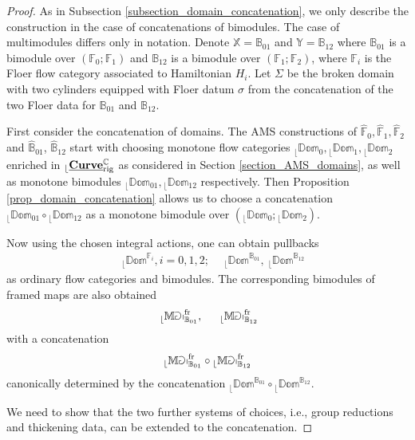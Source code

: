 \documentclass[reqno, 10pt]{amsart}
\numberwithin{equation}{section}
\numberwithin{equation}{section}
\theoremstyle{definition}
\theoremstyle{remark}
\newcommand{\beqn}{\begin{equation*}}
\newcommand{\eeqn}{\end{equation*}}
\newcommand{\mb}{\mathbb}
\renewcommand{\outer}{{}_{\lfloor}}
\newcommand{\uds}[1]{\underline{\smash{#1}}}
\begin{document}
\begin{proof}
As in Subsection \ref{subsection_domain_concatenation}, we only describe the construction in the case of concatenations of bimodules. The case of multimodules differs only in notation. Denote ${\mb X} = {\mb B}_{01}$ and ${\mb Y} = {\mb B}_{12}$ where ${\mb B}_{01}$ is a bimodule over $({\mb F}_0; {\mb F}_1)$ and $\mb{B}_{12}$ is a bimodule over $({\mb F}_1; \mb{F}_2)$, where ${\mb F}_i$ is the Floer flow category associated to Hamiltonian $H_i$. Let $\Sigma$ be the broken domain with two cylinders equipped with Floer datum $\sigma$ from the concatenation of the two Floer data for $\mb{B}_{01}$ and $\mb{B}_{12}$. 

First consider the concatenation of domains. The AMS constructions of $\hat {\mb F}_0, \hat {\mb F}_1, \hat {\mb F}_2$ and $\hat {\mb B}_{01}$, $\hat {\mb B}_{12}$ start with choosing monotone flow categories $\outer \mb{Dom}_0, \outer \mb{Dom}_1, \outer \mb{Dom}_2$ enriched in $\outer \uds{\bf Curve}_{\rm rig}^{\mb C}$ as considered in Section \ref{section_AMS_domains}, as well as monotone bimodules $\outer \mb{Dom}_{01}, \outer \mb{Dom}_{12}$ respectively. Then Proposition \ref{prop_domain_concatenation} allows us to choose a concatenation $\outer \mb{Dom}_{01} \circ \outer \mb{Dom}_{12}$ as a monotone bimodule over $(\outer \mb{Dom}_0; \outer \mb{Dom}_2)$. 

Now using the chosen integral actions, one can obtain pullbacks 
\begin{align*}
&\ \outer \mb{Dom}^{{\mb F}_i}, i = 0, 1, 2;\ &\ \outer \mb{Dom}^{{\mb B}_{01}},\ \outer \mb{Dom}^{{\mb B}_{12}}
\end{align*}
as ordinary flow categories and bimodules. The corresponding bimodules of framed maps are also obtained
\begin{align*}
&\ \outer \mb{Map}_{\mb{B}_{01}}^{\rm fr},\ &\ \outer \mb{Map}_{\mb{B}_{12}}^{\rm fr}
\end{align*}
with a concatenation 
\beqn
\outer \mb{Map}_{\mb{B}_{01}}^{\rm fr} \circ \outer \mb{Map}_{\mb{B}_{12}}^{\rm fr}
\eeqn
canonically determined by the concatenation $\outer\mb{Dom}^{{\mb B}_{01}}\circ \outer \mb{Dom}^{\mb{B}_{12}}$.

We need to show that the two further systems of choices, i.e., group reductions and thickening data, can be extended to the concatenation. 


\end{proof}
\end{document}
